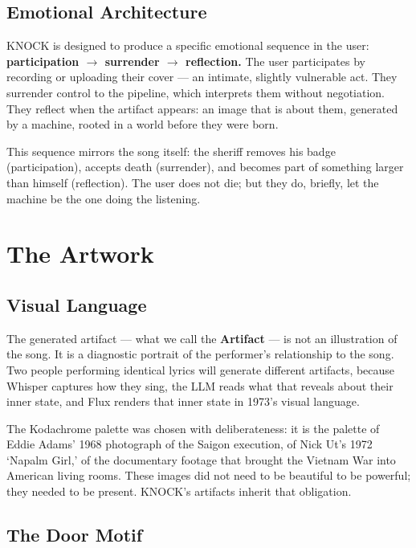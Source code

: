\documentclass[12pt, a4paper]{article}
\begin{document}
\subsection{Emotional Architecture}

KNOCK is designed to produce a specific emotional sequence in the user:
\textbf{participation $\to$ surrender $\to$ reflection.} The user participates by
recording or uploading their cover --- an intimate, slightly vulnerable act. They
surrender control to the pipeline, which interprets them without negotiation. They
reflect when the artifact appears: an image that is about them, generated by a
machine, rooted in a world before they were born.

This sequence mirrors the song itself: the sheriff removes his badge (participation),
accepts death (surrender), and becomes part of something larger than himself
(reflection). The user does not die; but they do, briefly, let the machine be the
one doing the listening.

\section{The Artwork}

\subsection{Visual Language}

The generated artifact --- what we call the \textbf{Artifact} --- is not an
illustration of the song. It is a diagnostic portrait of the performer's relationship
to the song. Two people performing identical lyrics will generate different artifacts,
because Whisper captures how they sing, the LLM reads what that reveals about their
inner state, and Flux renders that inner state in 1973's visual language.

The Kodachrome palette was chosen with deliberateness: it is the palette of Eddie
Adams' 1968 photograph of the Saigon execution, of Nick Ut's 1972 `Napalm Girl,'
of the documentary footage that brought the Vietnam War into American living rooms.
These images did not need to be beautiful to be powerful; they needed to be present.
KNOCK's artifacts inherit that obligation.

\subsection{The Door Motif}
\end{document}
